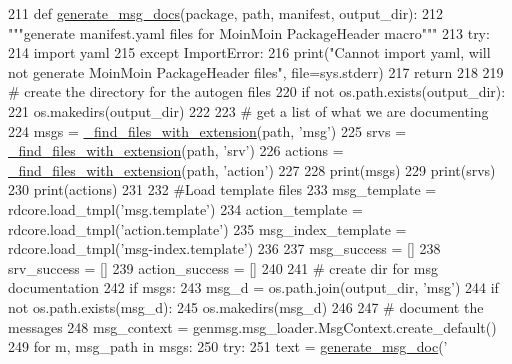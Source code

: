 \begin{DoxyCode}
211 \textcolor{keyword}{def }\hyperlink{namespacerosdoc__lite_1_1msgenator_a99725cc7a17d2af0c5b8ad68bec3cc4b}{generate\_msg\_docs}(package, path, manifest, output\_dir):
212     \textcolor{stringliteral}{"""generate manifest.yaml files for MoinMoin PackageHeader macro"""}
213     \textcolor{keywordflow}{try}:
214         \textcolor{keyword}{import} yaml
215     \textcolor{keywordflow}{except} ImportError:
216         print(\textcolor{stringliteral}{"Cannot import yaml, will not generate MoinMoin PackageHeader files"}, file=sys.stderr)
217         \textcolor{keywordflow}{return}
218 
219     \textcolor{comment}{# create the directory for the autogen files}
220     \textcolor{keywordflow}{if} \textcolor{keywordflow}{not} os.path.exists(output\_dir):
221         os.makedirs(output\_dir)
222 
223     \textcolor{comment}{# get a list of what we are documenting}
224     msgs = \hyperlink{namespacerosdoc__lite_1_1msgenator_a10e63ab0384c19aa19716060f76cefe5}{\_find\_files\_with\_extension}(path, \textcolor{stringliteral}{'msg'})
225     srvs = \hyperlink{namespacerosdoc__lite_1_1msgenator_a10e63ab0384c19aa19716060f76cefe5}{\_find\_files\_with\_extension}(path, \textcolor{stringliteral}{'srv'})
226     actions = \hyperlink{namespacerosdoc__lite_1_1msgenator_a10e63ab0384c19aa19716060f76cefe5}{\_find\_files\_with\_extension}(path, \textcolor{stringliteral}{'action'})
227 
228     print(msgs)
229     print(srvs)
230     print(actions)
231 
232     \textcolor{comment}{#Load template files}
233     msg\_template = rdcore.load\_tmpl(\textcolor{stringliteral}{'msg.template'})
234     action\_template = rdcore.load\_tmpl(\textcolor{stringliteral}{'action.template'})
235     msg\_index\_template = rdcore.load\_tmpl(\textcolor{stringliteral}{'msg-index.template'})
236 
237     msg\_success = []
238     srv\_success = []
239     action\_success = []
240 
241     \textcolor{comment}{# create dir for msg documentation}
242     \textcolor{keywordflow}{if} msgs:
243         msg\_d = os.path.join(output\_dir, \textcolor{stringliteral}{'msg'})
244         \textcolor{keywordflow}{if} \textcolor{keywordflow}{not} os.path.exists(msg\_d):
245             os.makedirs(msg\_d)
246 
247     \textcolor{comment}{# document the messages}
248     msg\_context = genmsg.msg\_loader.MsgContext.create\_default()
249     \textcolor{keywordflow}{for} m, msg\_path \textcolor{keywordflow}{in} msgs:
250         \textcolor{keywordflow}{try}:
251             text = \hyperlink{namespacerosdoc__lite_1_1msgenator_ab47d770be1a32293ef644c2771414b15}{generate\_msg\_doc}(\textcolor{stringliteral}{'%
}
\end{DoxyCode}
